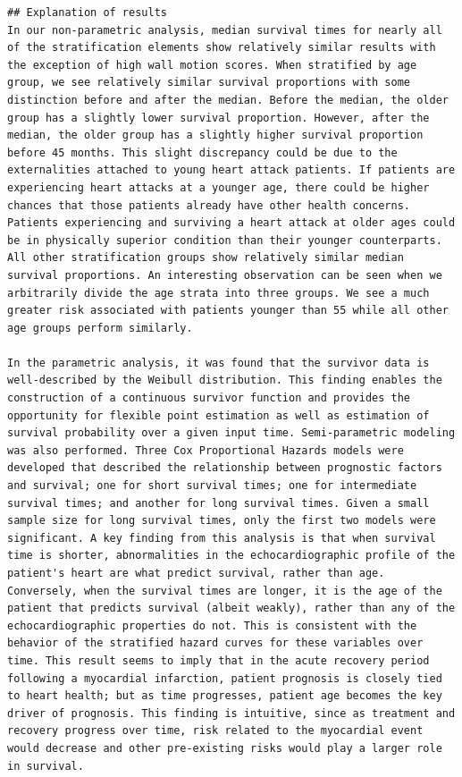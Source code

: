 \documentclass[
]{article}
\begin{document}
\begin{verbatim}
## Explanation of results
In our non-parametric analysis, median survival times for nearly all of the stratification elements show relatively similar results with the exception of high wall motion scores. When stratified by age group, we see relatively similar survival proportions with some distinction before and after the median. Before the median, the older group has a slightly lower survival proportion. However, after the median, the older group has a slightly higher survival proportion before 45 months. This slight discrepancy could be due to the externalities attached to young heart attack patients. If patients are experiencing heart attacks at a younger age, there could be higher chances that those patients already have other health concerns. Patients experiencing and surviving a heart attack at older ages could be in physically superior condition than their younger counterparts. All other stratification groups show relatively similar median survival proportions. An interesting observation can be seen when we arbitrarily divide the age strata into three groups. We see a much greater risk associated with patients younger than 55 while all other age groups perform similarly.

In the parametric analysis, it was found that the survivor data is well-described by the Weibull distribution. This finding enables the construction of a continuous survivor function and provides the opportunity for flexible point estimation as well as estimation of survival probability over a given input time. Semi-parametric modeling was also performed. Three Cox Proportional Hazards models were developed that described the relationship between prognostic factors and survival; one for short survival times; one for intermediate survival times; and another for long survival times. Given a small sample size for long survival times, only the first two models were significant. A key finding from this analysis is that when survival time is shorter, abnormalities in the echocardiographic profile of the patient's heart are what predict survival, rather than age. Conversely, when the survival times are longer, it is the age of the patient that predicts survival (albeit weakly), rather than any of the echocardiographic properties do not. This is consistent with the behavior of the stratified hazard curves for these variables over time. This result seems to imply that in the acute recovery period following a myocardial infarction, patient prognosis is closely tied to heart health; but as time progresses, patient age becomes the key driver of prognosis. This finding is intuitive, since as treatment and recovery progress over time, risk related to the myocardial event would decrease and other pre-existing risks would play a larger role in survival. 


\end{verbatim}
\end{document}

